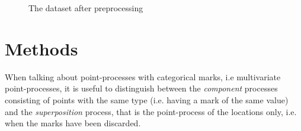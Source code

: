 \documentclass[12pt,a4paper,oneside,article]{memoir}
\begin{document}
\begin{figure}[htb]
  \begin{adjustwidth}{-2in}{-2in}
	  \centering
  \end{adjustwidth}
  \caption{The dataset after preprocessing}
  \label{fig:lansing_processed}
\end{figure}

\section{Methods}

When talking about point-processes with categorical marks, i.e multivariate point-processes,
it is useful to distinguish between the \emph{component} processes consisting of points with 
the same type (i.e. having a mark of the same value) and the \emph{superposition} process, that is 
the point-process of the locations only, i.e. when the marks have been discarded. 
\end{document}
